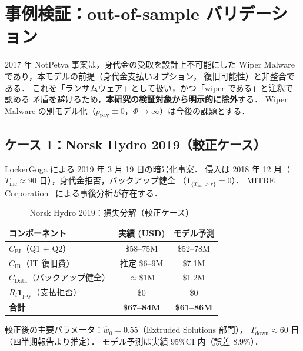 \documentclass{ipsjlike}
\newcommand{\ind}{\mathbf{1}}
\begin{document}
\section{事例検証：out-of-sample バリデーション}
\label{sec:cases}

\begin{remark}
  2017 年 NotPetya 事案は，身代金の受取を設計上不可能にした
  Wiper Malware であり，本モデルの前提（身代金支払いオプション，
  復旧可能性）と非整合である．
  これを「ランサムウェア」として扱い，かつ「wiper である」と注釈で認める
  矛盾を避けるため，\textbf{本研究の検証対象から明示的に除外}する．
  Wiper Malware の別モデル化（$p_{\mathrm{pay}} \equiv 0$，$\Phi \to \infty$）は今後の課題とする．
\end{remark}

\subsection{ケース 1：Norsk Hydro 2019（較正ケース）}

LockerGoga による 2019 年 3 月 19 日の暗号化事案．
侵入は 2018 年 12 月（$T_{\mathrm{inc}} \approx 90$ 日），身代金拒否，バックアップ健全
（$\ind_{\{T_{\mathrm{inc}} > r\}} = 0$）．
MITRE Corporation~\cite{mitre2022hydro} による事後分析が存在する．

\begin{table}[htb]
  \centering
  \caption{Norsk Hydro 2019：損失分解（較正ケース）}
  \fontsize{8}{11}\selectfont
  \begin{tabularx}{\columnwidth}{Xcc}
    \toprule
    \rowcolor{IPSJlightgray}
    コンポーネント & 実績 (USD) & モデル予測 \\
    \midrule
    $C_{\mathrm{BI}}$（Q1 + Q2） & \$58--75M & \$52--78M \\
    $C_{\mathrm{IR}}$（IT 復旧費） & 推定 \$6--9M & \$7.1M \\
    $C_{\mathrm{Data}}$（バックアップ健全） & $\approx$\$1M & \$1.2M \\
    $R_i\ind_{\mathrm{pay}}$（支払拒否） & \$0 & \$0 \\
    \midrule
    \textbf{合計} & \textbf{\$67--84M} & \textbf{\$61--86M} \\
    \bottomrule
  \end{tabularx}
\end{table}

較正後の主要パラメータ：$\hat{w}_0 = 0.55$（Extruded Solutions 部門），
$T_{\mathrm{down}} \approx 60$ 日（四半期報告より推定）．
モデル予測は実績 95\%CI 内（誤差 8.9\%）．
\end{document}
